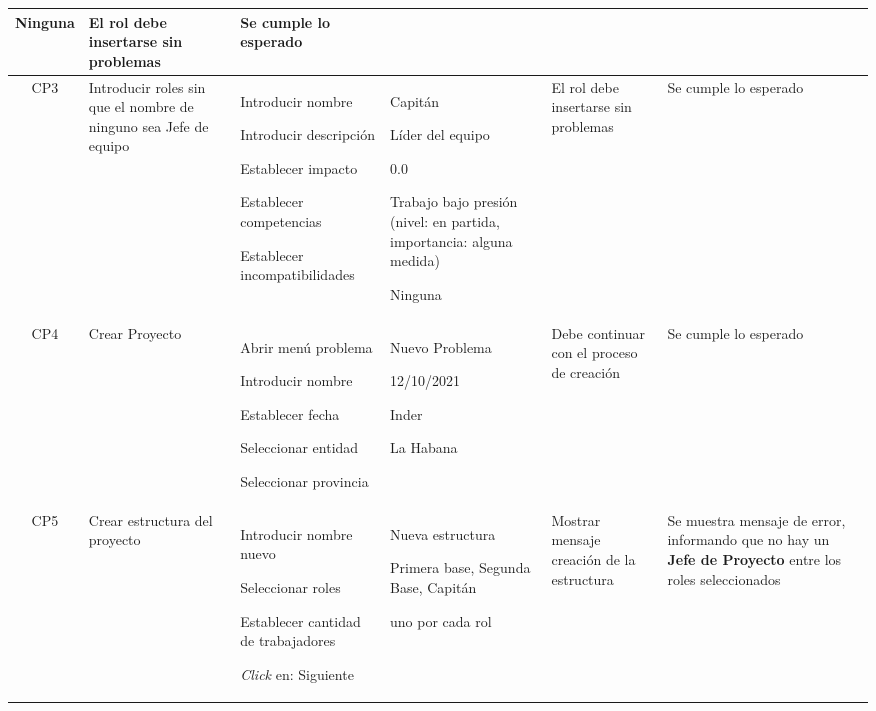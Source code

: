 \begin{table}[H]
{\begin{tabular}{c p{2.3cm} e{4.7cm} e{5cm} p{3cm} p{3cm}}
			\item Ninguna
			& El rol debe insertarse sin problemas      & Se cumple lo esperado                                                                                         \\ \hline
			CP3     & Introducir roles sin que el nombre de ninguno sea Jefe de equipo & \item Introducir nombre
			\item Introducir descripción
			\item Establecer impacto
			\item Establecer competencias
			\item Establecer incompatibilidades & \item Capitán       
			\item Líder del equipo
			\item 0.0
			\item Trabajo bajo presión (nivel: en partida, importancia: alguna medida)
			\item Ninguna
			& El rol debe insertarse sin problemas      & Se cumple lo esperado                                                                                         \\ \hline
			CP4     & Crear Proyecto                                                   & \item Abrir menú problema
			\item Introducir nombre
			\item Establecer fecha
			\item Seleccionar entidad
			\item Seleccionar provincia                  & \item Nuevo Problema 
			\item 12/10/2021
			\item Inder
			\item La Habana
			& Debe continuar con el proceso de creación & Se cumple lo esperado                                                                                         \\ \hline
			CP5     & Crear estructura del proyecto                                    & \item Introducir nombre nuevo
			\item Seleccionar roles
			\item Establecer cantidad de trabajadores
			\item \textit{Click} en: Siguiente                 & \item Nueva estructura
			\item Primera base, Segunda Base, Capitán
			\item uno por cada rol                                         
			
			& Mostrar mensaje creación de la estructura & Se muestra mensaje de error, informando que no hay un \textbf{Jefe de Proyecto} entre los roles seleccionados \\ \bottomrule
		\end{tabular}
	}
\end{table}

